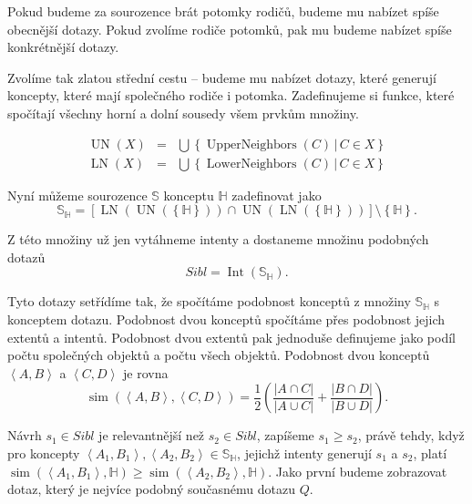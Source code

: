 \documentclass[12pt]{article}
\newcommand{\sep}{\,|\,}
\newcommand{\ssection}[1]{\subsection{#1}}
\newcommand{\sssection}[1]{\subsubsection{#1}}
\newcommand{\addk}[1]{\left(#1\right)}
\newcommand{\addh}[1]{\left[#1\right]}
\newcommand{\adds}[1]{\left\{#1\right\}}
\newcommand{\addsp}[1]{\left<#1\right>}
\DeclareMathOperator{\intfca}{Int}
\DeclareMathOperator{\lowerneighbors}{LowerNeighbors}
\DeclareMathOperator{\upperneighbors}{UpperNeighbors}
\DeclareMathOperator{\unfca}{UN}
\DeclareMathOperator{\lnfca}{LN}
\DeclareMathOperator{\simfca}{sim}
\newcommand{\alldoc}{\mathbb{D}}
\newcommand{\hledany}{\mathbb{H}}
\newcommand{\sibl}{\mathbb{S}}
\begin{document}
Pokud budeme za sourozence brát potomky rodičů, budeme mu nabízet spíše obecnější dotazy. Pokud zvolíme rodiče potomků, pak mu budeme nabízet spíše konkrétnější dotazy. 

Zvolíme tak zlatou střední cestu -- budeme mu nabízet dotazy, které generují koncepty, které mají společného rodiče i potomka. Zadefinujeme si funkce, které spočítají všechny horní a dolní sousedy všem prvkům množiny.

\begin{eqnarray}
\unfca(X)&=&\bigcup\adds{\upperneighbors(C)\sep C\in X}\\
\lnfca(X)&=&\bigcup\adds{\lowerneighbors(C)\sep C\in X}
\end{eqnarray}

Nyní můžeme sourozence $\sibl$ konceptu $\hledany$ zadefinovat jako
$$
\sibl_\hledany = \addh{\lnfca(\unfca(\adds{\hledany}))\cap\unfca(\lnfca(\adds{\hledany}))}\setminus\adds{\hledany}.
$$

Z této množiny už jen vytáhneme intenty a dostaneme množinu podobných dotazů
$$
Sibl=\intfca(\sibl_\hledany).
$$

Tyto dotazy setřídíme tak, že spočítáme podobnost konceptů z množiny $\sibl_\hledany$ s konceptem dotazu. Podobnost dvou konceptů spočítáme přes podobnost jejich extentů a intentů. Podobnost dvou extentů pak jednoduše definujeme jako podíl počtu společných objektů a počtu všech objektů. Podobnost dvou konceptů $\addsp{A, B}$ a $\addsp{C, D}$ je rovna
$$
\simfca(\addsp{A, B}, \addsp{C, D}) = \frac12\addk{\frac{|A\cap C|}{|A\cup C|} + \frac{|B\cap D|}{|B\cup D|}}.
$$

Návrh $s_1\in Sibl$ je relevantnější než $s_2\in Sibl$, zapíšeme $s_1\ge s_2$, právě tehdy, když pro koncepty $\addsp{A_1, B_1}, \addsp{A_2, B_2} \in \sibl_\hledany$, jejichž intenty generují $s_1$ a $s_2$, platí $\simfca(\addsp{A_1, B_1}, \hledany)\ge\simfca(\addsp{A_2, B_2}, \hledany)$. Jako první budeme zobrazovat dotaz, který je nejvíce podobný současnému dotazu $Q$.


\end{document}
